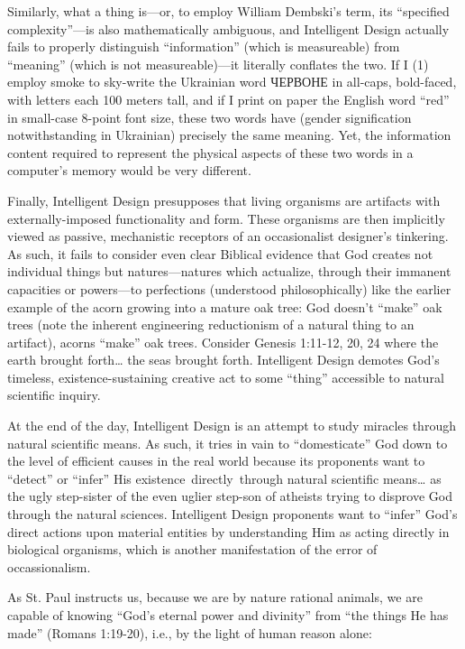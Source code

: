 Similarly, what a thing is—or, to employ William Dembski’s term, its “specified complexity”—is also mathematically ambiguous, and Intelligent Design actually fails to properly distinguish “information” (which is measureable) from “meaning” (which is not measureable)—it literally conflates the two. If I (1) employ smoke to sky-write the Ukrainian word ЧЕРВОНЕ in all-caps, bold-faced, with letters each 100 meters tall, and if I print on paper the English word “red” in small-case 8-point font size, these two words have (gender signification notwithstanding in Ukrainian) precisely the same meaning. Yet, the information content required to represent the physical aspects of these two words in a computer’s memory would be very different.

Finally, Intelligent Design presupposes that living organisms are artifacts with externally-imposed functionality and form. These organisms are then implicitly viewed as passive, mechanistic receptors of an occasionalist designer’s tinkering. As such, it fails to consider even clear Biblical evidence that God creates not individual things but natures—natures which actualize, through their immanent capacities or powers—to perfections (understood philosophically) like the earlier example of the acorn growing into a mature oak tree: God doesn’t “make” oak trees (note the inherent engineering reductionism of a natural thing to an artifact), acorns “make” oak trees. Consider Genesis 1:11-12, 20, 24 where the earth brought forth… the seas brought forth. Intelligent Design demotes God’s timeless, existence-sustaining creative act to some “thing” accessible to natural scientific inquiry.

At the end of the day, Intelligent Design is an attempt to study miracles through natural scientific means. As such, it tries in vain to “domesticate” God down to the level of efficient causes in the real world because its proponents want to “detect” or “infer” His existence directly through natural scientific means… as the ugly step-sister of the even uglier step-son of atheists trying to disprove God through the natural sciences. Intelligent Design proponents want to “infer” God’s direct actions upon material entities by understanding Him as acting directly in biological organisms, which is another manifestation of the error of occassionalism.

As St. Paul instructs us, because we are by nature rational animals, we are capable of knowing “God’s eternal power and divinity” from “the things He has made” (Romans 1:19-20), i.e., by the light of human reason alone:


